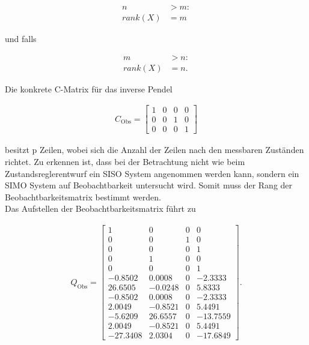 \documentclass[
	pagesize,
	fontsize=12pt,
	paper=a4,
	oneside,
   reqno
]{scrartcl}
\begin{document}
\begin{align*}
    n &> m: \\
    rank(X) &= m
\end{align*}

und falls

\begin{align*}
    m &> n: \\
    rank(X) &= n.
\end{align*}

Die konkrete C-Matrix für das inverse Pendel

\begin{align}
    C_{\mathrm{Obs}} = 
    \begin{bmatrix}
        1 & 0 & 0 & 0 \\
        0 & 0 & 1 & 0 \\
        0 & 0 & 0 & 1
    \end{bmatrix}
\end{align}

besitzt p Zeilen, wobei sich die Anzahl der Zeilen nach den messbaren Zuständen richtet. Zu erkennen ist, dass bei der Betrachtung nicht wie beim Zustandsreglerentwurf ein SISO System angenommen werden kann, sondern ein SIMO System auf Beobachtbarkeit untersucht wird. Somit muss der Rang der Beobachtbarkeitsmatrix bestimmt werden.\\
Das Aufstellen der Beobachtbarkeitsmatrix führt zu

\begin{align}
    Q_{\mathrm{Obs}} = 
    \begin{bmatrix}
        1 & 0 & 0 & 0 \\
        0 & 0 & 1 & 0 \\
        0 & 0 & 0 & 1 \\
        0 & 1 & 0 & 0 \\
        0 & 0 & 0 & 1 \\
        -0.8502 & 0.0008 & 0 & -2.3333 \\
       26.6505 & -0.0248 & 0 & 5.8333 \\
       -0.8502 & 0.0008 & 0 & -2.3333 \\
        2.0049 & -0.8521 & 0 & 5.4491 \\
       -5.6209 & 26.6557 & 0 & -13.7559 \\
        2.0049 & -0.8521 & 0 & 5.4491 \\
      -27.3408 & 2.0304 & 0 & -17.6849
    \end{bmatrix}.
\end{align}
\end{document}
